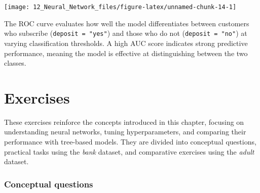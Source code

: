 \documentclass[
  11pt,
]{book}
\newcommand{\passthrough}[1]{#1}
\theoremstyle{definition}
\theoremstyle{definition}
\theoremstyle{definition}
\theoremstyle{definition}
\theoremstyle{remark}
\begin{document}
\begin{center}\texttt{[image: 12\_Neural\_Network\_files/figure-latex/unnamed-chunk-14-1]} \end{center}

The ROC curve evaluates how well the model differentiates between customers who subscribe (\passthrough{\lstinline!deposit = "yes"!}) and those who do not (\passthrough{\lstinline!deposit = "no"!}) at varying classification thresholds. A high AUC score indicates strong predictive performance, meaning the model is effective at distinguishing between the two classes.

\section*{Exercises}\label{exercises-8}


These exercises reinforce the concepts introduced in this chapter, focusing on understanding neural networks, tuning hyperparameters, and comparing their performance with tree-based models. They are divided into conceptual questions, practical tasks using the \emph{bank} dataset, and comparative exercises using the \emph{adult} dataset.

\subsubsection*{Conceptual questions}\label{conceptual-questions-10}
\end{document}
